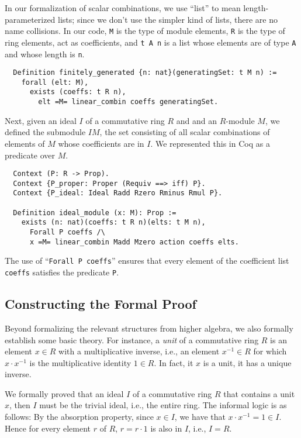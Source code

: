 \documentclass{article}
\begin{document}
In our formalization of scalar combinations, we use  ``list'' to mean
length-parameterized lists; since we don't use the simpler kind of lists, there
are no name collisions. In our code, \texttt{M} is the type of module elements,
\texttt{R} is the type of ring elements, act as coefficients, and
\texttt{t A n} is a list whose elements are of type \texttt{A} and whose length
is \texttt{n}.

\begin{verbatim}
  Definition finitely_generated {n: nat}(generatingSet: t M n) :=
    forall (elt: M),
      exists (coeffs: t R n),
        elt =M= linear_combin coeffs generatingSet.
\end{verbatim}

Next, given an ideal \(I\) of a commutative ring $R$ and and an $R$-module
\(M\),  we defined the submodule $IM$, the set consisting of all scalar
combinations of elements of \(M\) whose coefficients are in  \(I\). We
represented this in Coq as a predicate over \(M\).

\begin{verbatim}
  Context (P: R -> Prop).
  Context {P_proper: Proper (Requiv ==> iff) P}.
  Context {P_ideal: Ideal Radd Rzero Rminus Rmul P}.
  
  Definition ideal_module (x: M): Prop :=
    exists (n: nat)(coeffs: t R n)(elts: t M n),
      Forall P coeffs /\
      x =M= linear_combin Madd Mzero action coeffs elts.
\end{verbatim}

The use of  ``\verb|Forall P coeffs|'' ensures that every element of the
coefficient list \texttt{coeffs} satisfies the predicate \texttt{P}.  

\subsection{Constructing the Formal Proof}
Beyond formalizing the relevant structures from higher algebra, we also
formally establish some basic theory. For instance, a \emph{unit} of a
commutative ring $R$ is an element $x \in R$ with a multiplicative inverse,
i.e., an element $x^{-1} \in R$ for which $x \cdot x^{-1}$ is the
multiplicative identity $1 \in R$.  In fact, it $x$ is a unit, it has a unique 
inverse. 
 
We formally proved that an ideal $I$ of a commutative ring $R$ that contains a
unit $x$, then $I$ must be the trivial ideal, i.e., the entire ring.  The
informal logic is as follows:  By the absorption property, since $x \in I$, we
have that $x \cdot x^{-1} = 1 \in I$.  Hence for every element $r$ of $R$,
$r = r \cdot 1$ is also in $I$, i.e., $I=R$. 
\end{document}
